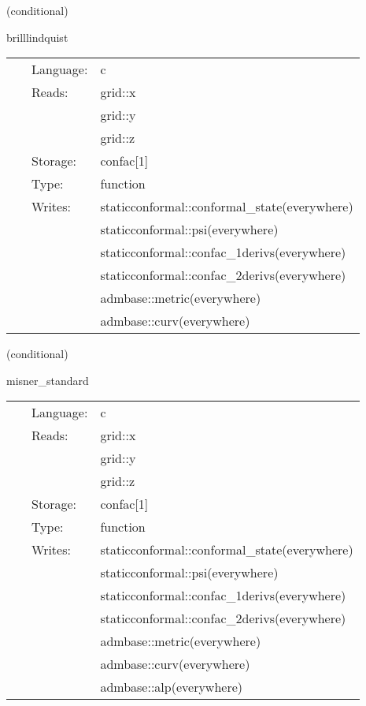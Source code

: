 \documentclass{article}
\begin{document}
\vspace{5mm}

   (conditional) 

\hspace{5mm} brilllindquist 

\hspace{5mm}{\it construct initial data for brill lindquist black holes } 


\hspace{5mm}

 \begin{tabular*}{160mm}{cll} 
~ & Language:  & c \\ 
~ & Reads:  & grid::x \\ 
~& ~ &grid::y\\ 
~& ~ &grid::z\\ 
~ & Storage:  & confac[1] \\ 
~ & Type:  & function \\ 
~ & Writes:  & staticconformal::conformal\_state(everywhere) \\ 
~& ~ &staticconformal::psi(everywhere)\\ 
~& ~ &staticconformal::confac\_1derivs(everywhere)\\ 
~& ~ &staticconformal::confac\_2derivs(everywhere)\\ 
~& ~ &admbase::metric(everywhere)\\ 
~& ~ &admbase::curv(everywhere)\\ 
\end{tabular*} 


\vspace{5mm}

   (conditional) 

\hspace{5mm} misner\_standard 

\hspace{5mm}{\it construct initial data for two misner black holes } 


\hspace{5mm}

 \begin{tabular*}{160mm}{cll} 
~ & Language:  & c \\ 
~ & Reads:  & grid::x \\ 
~& ~ &grid::y\\ 
~& ~ &grid::z\\ 
~ & Storage:  & confac[1] \\ 
~ & Type:  & function \\ 
~ & Writes:  & staticconformal::conformal\_state(everywhere) \\ 
~& ~ &staticconformal::psi(everywhere)\\ 
~& ~ &staticconformal::confac\_1derivs(everywhere)\\ 
~& ~ &staticconformal::confac\_2derivs(everywhere)\\ 
~& ~ &admbase::metric(everywhere)\\ 
~& ~ &admbase::curv(everywhere)\\ 
~& ~ &admbase::alp(everywhere)\\ 
\end{tabular*} 
\end{document}
